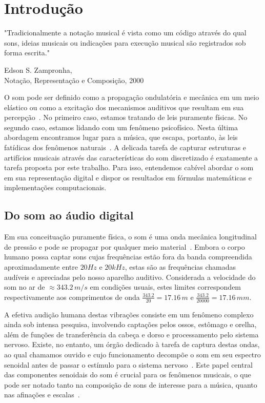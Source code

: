 \chapter{Introdução} %
\label{cap:intro} 
\epigraph{"Tradicionalmente a notação musical é vista como um código através do qual sons, ideias musicais ou indicações para execução musical são registrados sob forma escrita."}{Edson S. Zampronha, \\ Notação, Representação e Composição, 2000}


O som pode ser definido como a propagação ondulatória e mecânica em um meio elástico
ou como a excitação dos mecanismos auditivos que resultam em sua percepção~\cite{Everest}. No primeiro
caso, estamos tratando de leis puramente físicas. No segundo caso, estamos lidando com um
fenômeno psicofísico. Nesta última abordagem encontramos lugar para a música, que escapa,
portanto, às leis fatídicas dos fenômenos naturais~\cite{Roederer}. A delicada tarefa de capturar estruturas
e artifícios musicais através das características do som discretizado
é exatamente a tarefa proposta por este trabalho. Para isso, entendemos cabível
abordar o som em sua representação digital e dispor os resultados em fórmulas matemáticas e implementações computacionais. 


    \section{Do som ao áudio digital}\label{sec:audio}

Em sua conceituação puramente física, o som é uma onda mecânica longitudinal de pressão e pode se propagar por qualquer meio material~\cite{}.
Embora o corpo humano possa captar sons cujas frequências estão fora da banda compreendida aproximadamente entre $20Hz$ e $20 kHz$, estas são as frequências chamadas audíveis e apreciadas pelo nosso aparelho auditivo.
 Considerada a velocidade do som no ar de $\approx 343.2\,m/s$ em condições usuais,
estes limites correspondem respectivamente aos comprimentos de onda $\frac{343.2}{20} = 17.16\,m$ e $\frac{343.2}{20000}=17.16\,mm$.

A efetiva audição humana destas vibrações consiste em um fenômeno complexo ainda sob intensa pesquisa, involvendo captações pelos ossos, estômago e orelha, além de funções de transferência da cabeça e dorso e processamento pelo sistema nervoso. Existe, no entanto, um órgão dedicado à tarefa de captura destas ondas, ao qual chamamos ouvido e cujo funcionamento decompõe o som em seu espectro senoidal antes de passar o estímulo para o sistema nervoso~\cite{Roederer}. Este papel central das componentes senoidais do som é crucial para os fenômenos musicais, o que pode ser notado tanto na composição de sons de interesse para a música, quanto nas afinações e escalas~\cite{floEsp}.

